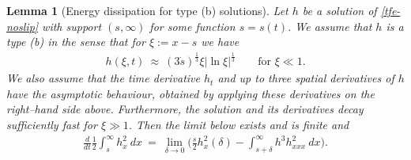 \documentclass[10pt,a4paper]{amsart}
\newtheorem{lemma}{Lemma}
\renewcommand{\d}{\delta}
\begin{document}
  \begin{lemma}[Energy dissipation for type (b) solutions]
    Let $h$ be a solution of \eqref{tfe-noslip} with support $(s,\infty)$ for
    some function $s = s(t)$. We assume that $h$ is a type (b) in the sense that
    for $\xi :=x- s$ we have
    \begin{align}
      h(\xi,t) \ %
      \approx \ (3 \dot s)^{\frac 13} \xi |\ln \xi|^{\frac 13} \qquad
      \text{for $\xi \ll 1$.}
    \end{align}
    We also assume that the time derivative $h_t$ and up to three spatial
    derivatives of $h$ have the asymptotic behaviour, obtained by applying these
    derivatives on the right--hand side above.  Furthermore, the solution and its
    derivatives decay sufficiently fast for $\xi\gg 1$. Then the limit below
    exists and is finite and
    \begin{align}
      \frac d{dt} \frac 12   \int_{s}^\infty h_x^2\ dx    \ %
      = \ \lim_{\d \to 0} \Big( \frac{\dot s}2h_x^2(\d )-\int_{s + \d}^{\infty}h^3h_{xxx}^2 \ dx \Big).
    \end{align}
\end{lemma}
\end{document}
